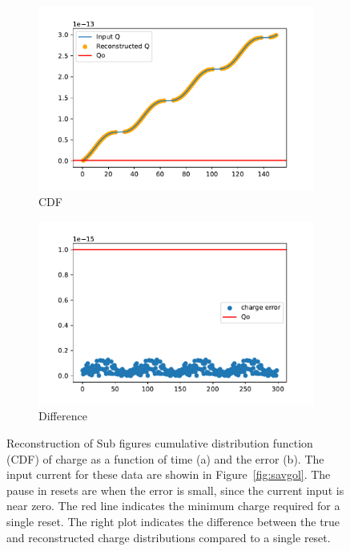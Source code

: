 \begin{figure}
\centering
\begin{subfigure}{.5\textwidth}
  \centering
  \includegraphics[width=\textwidth]{images/reconQ.pdf}
  \caption{CDF}
\end{subfigure}%
\begin{subfigure}{.5\textwidth}
  \centering
  \includegraphics[width=\textwidth]{images/diffQ.pdf}
  \caption{Difference}
\end{subfigure}
\caption{Reconstruction of Sub figures cumulative distribution function (CDF) of charge as a function of time (a) and the error (b).
The input current for these data are showin in Figure~\ref{fig:savgol}.
The pause in resets are when the error is small, since the current input is near zero.
The red line indicates the minimum charge required for a single reset.
The right plot indicates the difference between the true and reconstructed charge distributions compared to a single reset.
}
\label{fig:reconQ}
\end{figure}

